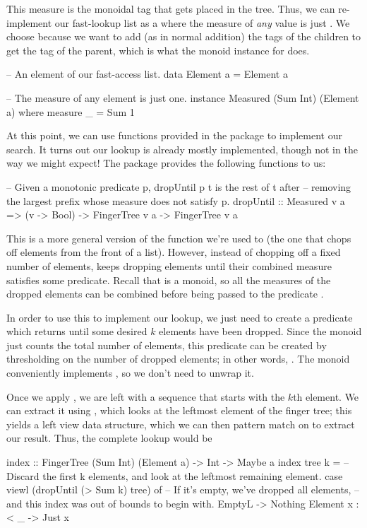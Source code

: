 This measure is the monoidal tag that gets placed in the tree. Thus, we can re-implement our
fast-lookup list as a  where the measure of \emph{any} value is just . We choose  because we want to add (as in normal addition) the tags of the children
to get the tag of the parent, which is what the monoid instance for  does.
\begin{haskell}
-- An element of our fast-access list.
data Element a = Element a

-- The measure of any element is just one.
instance Measured (Sum Int) (Element a) where
    measure _ = Sum 1
\end{haskell}

At this point, we can use functions provided in the  package to implement our
search. It turns out our lookup is already mostly implemented, though not in the way we might
expect! The package provides the following functions to us:
\begin{haskell}
-- Given a monotonic predicate p, dropUntil p t is the rest of t after
-- removing the largest prefix whose measure does not satisfy p.
dropUntil :: Measured v a => (v -> Bool) -> FingerTree v a -> FingerTree v a
\end{haskell}
This is a more general version of the  function we're used to (the one that chops off
elements from the front of a list). However, instead of chopping off a fixed number of elements,
 keeps dropping elements until their combined measure satisfies some predicate.
Recall that  is a monoid, so all the measures of the dropped elements can be combined
before being passed to the predicate . 

In order to use this to implement our lookup, we just need to create a predicate  which
returns  until some desired $k$ elements have been dropped. Since the monoid just
counts the total number of elements, this predicate can be created by thresholding on the number of
dropped elements; in other words, . The  monoid conveniently
implements , so we don't need to unwrap it.

Once we apply , we are left with a sequence that starts with the $k$th
element. We can extract it using , which looks at the leftmost element of the finger
tree; this yields a left view data structure, which we can then pattern match on to extract our
result. Thus, the complete lookup would be
\begin{haskell}
index :: FingerTree (Sum Int) (Element a) -> Int -> Maybe a
index tree k = 
  -- Discard the first k elements, and look at the leftmost remaining element.
  case viewl (dropUntil (> Sum k) tree) of
    -- If it's empty, we've dropped all elements,
    -- and this index was out of bounds to begin with.
    EmptyL -> Nothing
    Element x :< _ -> Just x
\end{haskell}

